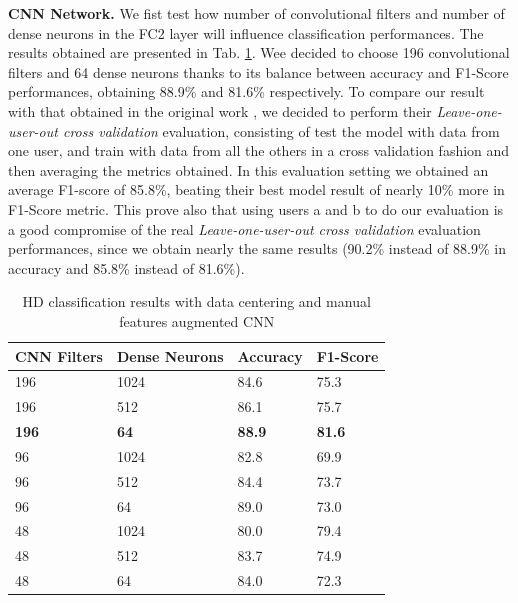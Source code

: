 \textbf{CNN Network.} We fist test how number of convolutional filters and number of dense neurons in the FC2 layer will influence classification performances. The results obtained are presented in Tab. \ref{tab:model-selection}. Wee decided to choose 196 convolutional filters and 64 dense neurons thanks to its balance between accuracy and F1-Score performances, obtaining 88.9\% and 81.6\% respectively. To compare our result with that obtained in the original work \cite{stisen2015smart}, we decided to perform their \textit{Leave-one-user-out cross validation} evaluation, consisting of test the model with data from one user, and train with data from all the others in a cross validation fashion and then averaging the metrics obtained. In this evaluation setting we obtained an average F1-score of 85.8\%, beating their best model result of nearly 10\% more in F1-Score metric. This prove also that using users a and b to do our evaluation is a good compromise of the real \textit{Leave-one-user-out cross validation} evaluation performances, since we obtain nearly the same results (90.2\% instead of 88.9\% in accuracy and 85.8\% instead of 81.6\%).

\begin{table}[h]
	\begin{center}
		\begin{tabular}{ p{1.8cm}p{1.7cm}p{1.7cm}p{1.7cm} }
			\hline
			CNN Filters & Dense Neurons & Accuracy & F1-Score \\
			\hline
			196 & 1024 & 84.6 & 75.3 \\
			196 & 512 & 86.1 & 75.7 \\
			\textbf{196} & \textbf{64} & \textbf{88.9} & \textbf{81.6} \\
			96 & 1024 & 82.8 & 69.9 \\
			96 & 512 & 84.4 & 73.7 \\
			96 & 64 & 89.0 & 73.0 \\
			48 & 1024 & 80.0 & 79.4 \\
			48 & 512 & 83.7 & 74.9 \\
			48 & 64 & 84.0 & 72.3 \\
			\hline
		\end{tabular}
		\caption{\label{tab:model-selection} HD classification results with data centering and manual features augmented CNN}
	\end{center}
\end{table}



